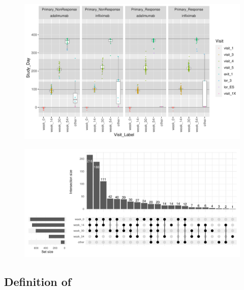 \begin{outline}
\begin{figure}
    \centering
    \includegraphics[width=1.0\textwidth,page=1]{mainmatter/figures/chapter_04/process_pheno.pheno_filtered_dge.Study_Day_vs_Visit_Label.pdf}
    \caption{}
    \label{fig:multipants_studyDay_boxplots}
\end{figure}

\begin{figure}
    \centering
    \includegraphics[width=1.0\textwidth,page=1]{mainmatter/figures/chapter_04/process_pheno.pheno_filtered_dge.Visit_Label_upset.pdf}
    \caption{}
    \label{fig:multipants_visits_upset}
\end{figure}

\subsection{Definition of }


\end{outline}
